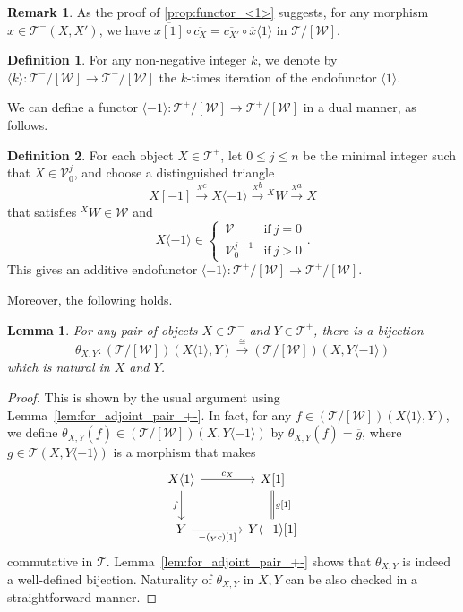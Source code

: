 \documentclass[a4paper,reqno,10pt]{amsart}
\DeclareRobustCommand{\darkblueedit}[1]{#1}
\newtheorem{lemma}[lemma]{Lemma}
\theoremstyle{definition}
\newtheorem{definition}[definition]{Definition}
\theoremstyle{definition}
\newtheorem{remark}[remark]{Remark}
\theoremstyle{definition}
\theoremstyle{definition}
\theoremstyle{plain}
\newcommand{\ovl}[1]{\overline{#1}}
\newcommand{\CT}{\mathcal{T}}
\newcommand{\CV}{\mathcal{V}}
\newcommand{\CW}{\mathcal{W}}
\begin{document}
\color{blue}
\begin{remark}
\label{rem:c_is_natural}
As the proof of \cref{prop:functor_<1>} suggests, for any morphism $x\in\CT^-(X,X')$, we have $\ovl{x[1]}\circ \ovl{c_X}=\ovl{c_{X'}}\circ \ovl{x}\langle 1\rangle$ in $\CT/[\CW]$.
\end{remark}
\normalcolor

\begin{definition}
For any non-negative integer $k$, we denote by $\langle k\rangle\colon\CT^-/[\CW]\to \CT^-/[\CW]$ the $k$-times iteration of the endofunctor $\langle1\rangle$.
\end{definition}


We can define a functor $\langle-1\rangle\colon\CT^+/[\CW]\to\CT^+/[\CW]$ in a dual manner, as follows. 
\begin{definition}\label{def:functor_<-1>}
For each object $X\in\CT^+$, let $0\le j\le n$ be the minimal integer such that $X\in\CV_0^j$, and choose a distinguished triangle
\begin{equation}\label{dtriXXWX}
X[-1]\xrightarrow{{}_Xc}X\langle -1\rangle\xrightarrow{{}_Xb}{}^XW\xrightarrow{{}_Xa}X
\end{equation}
that satisfies ${}^XW\in\CW$ and 
\[
X\langle -1\rangle\in
\begin{cases}
\, \CV & \text{if}\ j=0\\
\, \CV_0^{j-1} & \text{if}\ j>0
\end{cases}.
\]
This gives an additive \darkblueedit{endofunctor} $\langle-1\rangle\colon\CT^+/[\CW]\to\CT^+/[\CW]$.
\end{definition}

\normalcolor

Moreover, the following holds.
\begin{lemma}\label{lem:adjoint_+-}
For any pair of objects $X\in\CT^-$ and $Y\in\CT^+$, there is a bijection
\[ \theta_{X,Y}\colon (\CT/[\CW])(X\langle1\rangle,Y)\xrightarrow{\cong}(\CT/[\CW])(X,Y\langle-1\rangle) \]
\normalcolor
which is natural in $X$ and $Y$.
\end{lemma}
\begin{proof}
This is shown by the usual argument using Lemma~\ref{lem:for_adjoint_pair_+-}.
In fact, for any $\overline{f}\in(\CT/[\CW])(X\langle1\rangle,Y)$, we define $\theta_{X,Y}(\overline{f})\in(\CT/[\CW])(X,Y\langle-1\rangle)$ by $\theta_{X,Y}(\overline{f})=\overline{g}$, where $g\in\CT(X,Y\langle-1\rangle)$ is a morphism that makes
\[
\begin{tikzcd}[row sep=0.8cm, column sep=1.2cm]
X\langle1\rangle \arrow{r}{c_X}\arrow{d}[swap]{f}
&X{[}1{]} \arrow[equal]{d}{g[1]}
\\
Y\arrow{r}[swap]{-({}_Yc){[}1{]}}
&Y\langle-1\rangle{[}1{]}
\end{tikzcd}
\]
commutative in $\CT$. Lemma~\ref{lem:for_adjoint_pair_+-} 
\color{blue}
shows that 
\normalcolor 
$\theta_{X,Y}$ is indeed a well-defined bijection. Naturality of $\theta_{X,Y}$ in $X,Y$ can be also checked in a straightforward manner.
\normalcolor
\end{proof}
\end{document}
